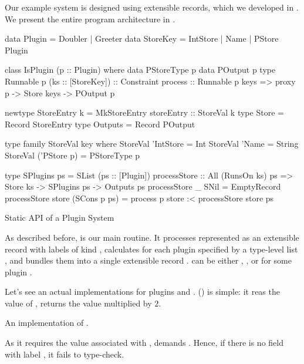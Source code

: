\documentclass[demotion-paper.tex]{subfiles}
\begin{document}
Our example system is designed using extensible records, which we developed in .
We present the entire program architecture in .
\begin{listing}[tbp]
\begin{code}
data Plugin = Doubler | Greeter
data StoreKey = IntStore | Name
              | PStore Plugin

class IsPlugin (p :: Plugin) where
  data PStoreType p
  data POutput p
  type Runnable p (ks :: [StoreKey]) :: Constraint
  process :: Runnable p keys
    => proxy p -> Store keys -> POutput p

newtype StoreEntry k =
  MkStoreEntry {storeEntry :: StoreVal k}
type Store = Record StoreEntry
type Outputs = Record POutput

type family StoreVal key where
  StoreVal 'IntStore = Int
  StoreVal 'Name = String
  StoreVal ('PStore p) = PStoreType p

type SPlugins ps = SList (ps :: [Plugin])
processStore :: All (RunsOn ks) ps
  => Store ks -> SPlugins ps -> Outputs ps
processStore _ SNil = EmptyRecord
processStore store (SCons p ps) = 
  process p store :< processStore store ps
\end{code}
\caption{Static API of a Plugin System}
\label{lst:plugin-arch}
\end{listing}
As described before,  is our main routine.
It processes  represented as an extensible record with labels of kind , calculates  for each plugin specified by a type-level list , and bundles them into a single extensible record .
 can be either , , or  for some plugin .

Let's see an actual implementations for plugins  and .
 () is simple: it reas the value of , returns the value multiplied by $2$.
\begin{listing}[tbp]
\caption{An implementation of .}
\label{lst:plugin-double}
\end{listing}
As it requires the value associated with ,  demands .
Hence, if there is no field with label , it fails to type-check.
\end{document}
